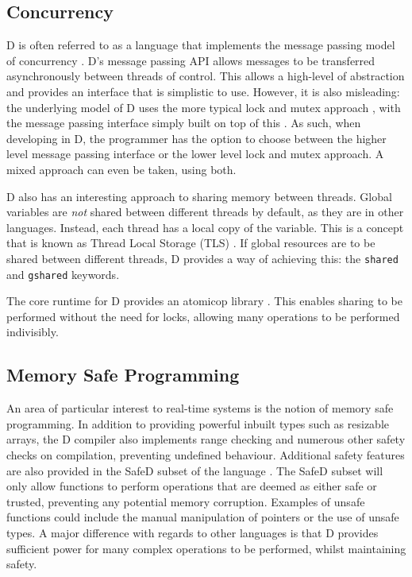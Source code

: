 \subsection{Concurrency}
D is often referred to as a language that implements the message passing model 
of concurrency \cite{ddili-book}. D's message passing API 
allows messages to be transferred asynchronously between threads of control.
This allows a high-level of abstraction and provides an 
interface that is simplistic to use. However, it is also misleading: the underlying 
model of D uses the more typical lock and mutex approach 
\cite{dlang-github-mutex}, 
with the message passing interface simply built on top of this 
\cite{dlang-github-concurrency}. 
As such, when developing in D, the programmer has the option to choose between 
the higher level message passing interface or the lower level lock and mutex 
approach. A mixed approach can even be taken, using both. 
\par\bigskip\noindent
D also has an interesting approach to sharing memory between threads. 
Global variables are \emph{not} shared between different threads by default, as 
they are in other languages. Instead, each thread has a local copy of the variable. 
This is a concept that is known as Thread Local Storage (TLS) 
\cite{migrate-to-shared}. 
If global resources are to be shared between different threads, D provides a way of 
achieving this: the \texttt{shared} and
\texttt{\textunderscore{}\textunderscore{}gshared} keywords.
\par\bigskip\noindent
The core runtime for D provides an atomicop library \cite{core-atomic}. 
This enables sharing to be performed without the 
need for locks, allowing many operations to be performed indivisibly.

\subsection{Memory Safe Programming}
An area of particular interest to real-time systems is the notion of memory 
safe programming. In addition to providing powerful inbuilt types such as 
resizable arrays, the D compiler also implements range checking and numerous other 
safety checks on compilation, preventing undefined behaviour.
Additional safety features are also provided in the SafeD subset of the language
\cite{safe-d}. The SafeD subset will only allow functions to perform 
operations that are deemed as either safe or trusted, preventing any 
potential memory corruption. Examples of unsafe functions could include the 
manual manipulation of pointers or the use of unsafe types. A major difference 
with regards to other languages is that D provides sufficient power for many complex 
operations to be performed, whilst maintaining safety.

